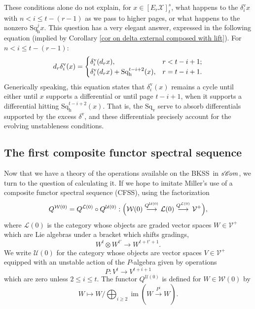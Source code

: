 \documentclass[11pt]{amsart} \renewcommand{\baselinestretch}{1.2}
\theoremstyle{plain}
\numberwithin{equation}{section} %
\theoremstyle{plain}
\numberwithin{equation}{chapter} %
\DeclareMathOperator{\im}{im}
\renewcommand{\to}{\longrightarrow}
\newcommand{\scrC}{\mathscr{C}}
\newcommand{\calV}{\mathcal{V}}
\newcommand{\calw}{\mathcal{W}}
\newcommand{\calu}{\mathcal{U}}
\newcommand{\call}{\mathcal{L}}
\newcommand{\calx}{\mathcal{X}}
\newcommand{\vect}[2]{\calV^{#1}_{#2}}
\newcommand{\algs}{{\scrC\!\textit{\normalfont\textit{om}}}}
\newcommand{\E}[5]{[E^{#1}_{#2}#3]^{#4}_{#5}}
\newcommand{\Edownup}[5]{[E_{#1}^{#2}#3]^{#4}_{#5}}
\newcommand{\uver}{^\mathrm{v}}
\newcommand{\dver}{_\mathrm{v}}
\newcommand{\dhor}{_\mathrm{h}}
\newcommand{\Sqh}{\mathrm{Sq}\dhor}
\newcommand{\Sqv}{\mathrm{Sq}\dver}
\newcommand{\deltav}{\delta\uver}
\renewcommand{\mapsto}{\longmapsto}
\newcommand{\BKSS}{BKSS}
\newcommand{\CFSS}{CFSS}
\newcommand{\SubsectionOrSection}[1]{\subsection{#1}}
\begin{document}
\begin{Introduction}
These conditions alone do not explain, for $x\in \Edownup{r}{}{\calx}{s}{t}$, what happens to the $\deltav_ix$ with $n< i \leq t-(r-1)$ as we pass to higher pages, or what happens to the nonzero $\Sqh^jx$. This question has a very elegant answer, expressed in the following equation (implied by Corollary \ref{cor on delta external composed with lift}). For $n< i \leq t-(r-1)$:
\[d_r\deltav_i(x)= \begin{cases}
\deltav_i(d_rx),&\textup{$r <t-i+1$};\\
\deltav_i(d_rx)+\Sqh^{t-i+2}(x),&\textup{$r =t-i+1$}.
\end{cases}\]
Generically speaking, this equation states that $\deltav_i(x)$ remains a cycle until either until $x$ supports a differential or until page $t-i+1$, when it supports a differential hitting $\Sqh^{t-i+2}(x)$. That is, the $\Sqv$ serve to absorb differentials supported by the excess $\deltav$, and these differentials precisely account for the evolving unstableness conditions.

\SubsectionOrSection{The first composite functor spectral sequence}
\label{The first composite functor spectral sequence}
Now that we have a theory of the operations available on the \BKSS\ in $s\algs$, we turn to the question of calculating it. If we hope to imitate Miller's use of a composite functor spectral sequence (\CFSS), %
using the factorization
\[Q^{\calw(0)}=Q^{\call(0)}\circ Q^{\calu(0)}  : \Bigl(\calw(0)\overset{Q^{\calu(0)}}{\to}\call(0)\overset{Q^{\call(0)}}{\to}\vect{+}{}\Bigr),\]
where $\call(0)$ is the category whose objects are graded vector spaces $W\in\vect{+}{}$ which are Lie algebras under a bracket which shifts gradings,
\[W^{t}\otimes W^{t'}\to W^{t+t'+1}.\]
We write $\calu(0)$ for the category whose objects are vector spaces $V\in \vect{+}{}$ equipped with an unstable action of the $P$-algebra given by operations
\[P:V^t\to V^{t+i+1}\]
which are zero unless $2\leq i\leq t$. The functor $Q^{\calu(0)}$ is defined for $W\in\calw(0)$ by
\[W\mapsto W/\textstyle\bigoplus_{i\geq2}\im(W\overset{P^i}{\to}W).\]


\end{Introduction}
\end{document}
